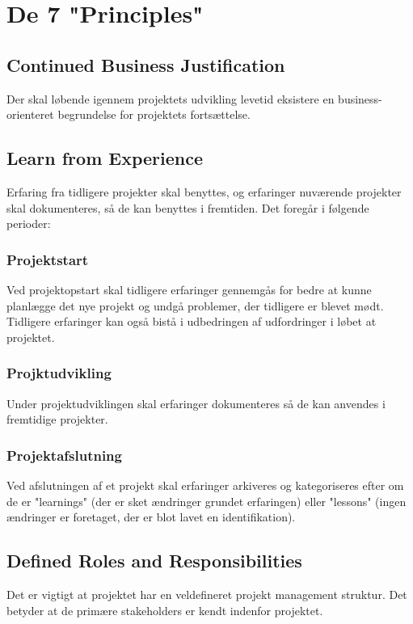 \chapter{De 7 "Principles"}

\section{Continued Business Justification}
Der skal løbende igennem projektets udvikling levetid eksistere en business-orienteret begrundelse for projektets fortsættelse.

\section{Learn from Experience}
Erfaring fra tidligere projekter skal benyttes, og erfaringer nuværende projekter skal dokumenteres, så de kan benyttes i fremtiden. Det foregår i følgende perioder:

\subsection*{Projektstart}
Ved projektopstart skal tidligere erfaringer gennemgås for bedre at kunne planlægge det nye projekt og undgå problemer, der tidligere er blevet mødt. Tidligere erfaringer kan også bistå i udbedringen af udfordringer i løbet at projektet.
\subsection*{Projktudvikling}
Under projektudviklingen skal erfaringer dokumenteres så de kan anvendes i fremtidige projekter.
\subsection*{Projektafslutning}
Ved afslutningen af et projekt skal erfaringer arkiveres og kategoriseres efter om de er "learnings" (der er sket ændringer grundet erfaringen) eller "lessons" (ingen ændringer er foretaget, der er blot lavet en identifikation).

\section{Defined Roles and Responsibilities}
\label{sec:defined_roles_and_responsibilities}
Det er vigtigt at projektet har en veldefineret projekt management struktur. Det betyder at de primære stakeholders er kendt indenfor projektet.

